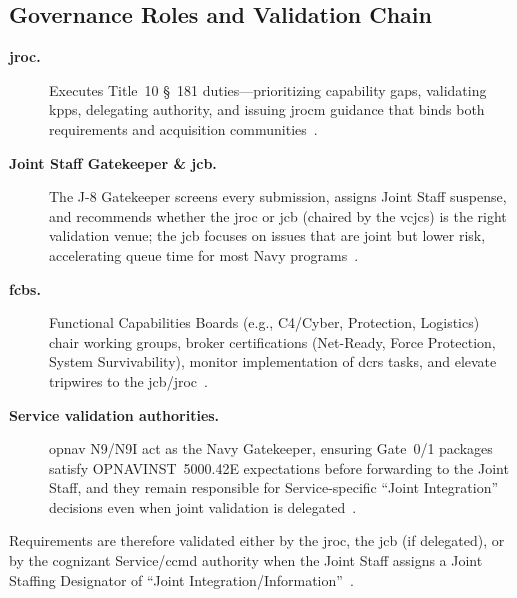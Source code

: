 \documentclass[../main.tex]{subfiles}
\begin{document}
\subsection{Governance Roles and Validation Chain}
\begin{description}
  \item[\textbf{\ac{jroc}.}] Executes Title~10 \S~181 duties---prioritizing capability gaps, validating \acp{kpp}, delegating authority, and issuing \ac{jrocm} guidance that binds both requirements and acquisition communities~\autocite{jcids-manual-2021,USC-10-181}.
  \item[\textbf{Joint Staff Gatekeeper \& \ac{jcb}.}] The J-8 Gatekeeper screens every submission, assigns Joint Staff suspense, and recommends whether the \ac{jroc} or \ac{jcb} (chaired by the \ac{vcjcs}) is the right validation venue; the \ac{jcb} focuses on issues that are joint but lower risk, accelerating queue time for most Navy programs~\autocite{jcids-manual-2021}.
  \item[\textbf{\acp{fcb}.}] Functional Capabilities Boards (e.g., C4/Cyber, Protection, Logistics) chair working groups, broker certifications (Net-Ready, Force Protection, System Survivability), monitor implementation of \acp{dcr} tasks, and elevate tripwires to the \ac{jcb}/\ac{jroc}~\autocite{jcids-manual-2021}.
  \item[\textbf{Service validation authorities.}] \ac{opnav} N9/N9I act as the Navy Gatekeeper, ensuring Gate~0/1 packages satisfy OPNAVINST~5000.42E expectations before forwarding to the Joint Staff, and they remain responsible for Service-specific ``Joint Integration'' decisions even when joint validation is delegated~\autocite{OPNAVINST5000-42E}.
\end{description}
Requirements are therefore validated either by the \ac{jroc}, the \ac{jcb} (if delegated), or by the cognizant Service/\ac{ccmd} authority when the Joint Staff assigns a Joint Staffing Designator of ``Joint Integration/Information''~\autocite{jcids-manual-2021}.
\end{document}
